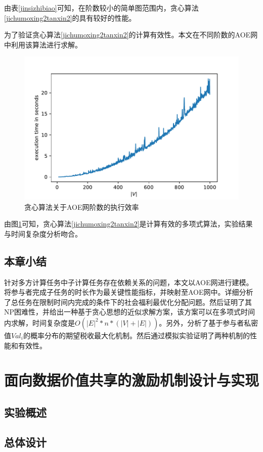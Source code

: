\documentclass[promaster]{thesis-uestc}
\begin{document}
由表\ref{jinsizhibiao}可知，在阶数较小的简单图范围内，贪心算法\ref{jichumoxing2tanxin2}的具有较好的性能。

为了验证贪心算法\ref{jichumoxing2tanxin2}的计算有效性。本文在不同阶数的AOE网中利用该算法进行求解。

\begin{figure}[h]
    \includegraphics{exp/exetime.pdf}
    \caption{贪心算法关于AOE网阶数的执行效率}
    \label{exetime}
\end{figure}
由图\ref{exetime}可知，贪心算法\ref{jichumoxing2tanxin2}是计算有效的多项式算法，实验结果与时间复杂度分析吻合。

\section{本章小结}
针对多方计算任务中子计算任务存在依赖关系的问题，本文以AOE网进行建模。将参与者完成子任务的时长作为最关键性能指标，并映射至AOE网中。详细分析了总任务在限制时间内完成的条件下的社会福利最优化分配问题。然后证明了其NP困难性，并给出一种基于贪心思想的近似求解方案，该方案可以在多项式时间内求解，时间复杂度是$O(|E|^2*n*(|V|+|E|))$。另外，分析了基于参与者私密值$Val_i$的概率分布的期望税收最大化机制。然后通过模拟实验证明了两种机制的性能和有效性。


\chapter{面向数据价值共享的激励机制设计与实现}
\section{实验概述}

\section{总体设计}
\end{document}
